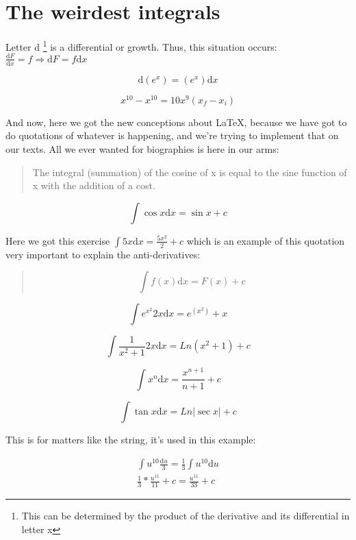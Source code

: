 \documentclass{article}
\begin{document}
\section*{The weirdest integrals}

\noindent Letter d \footnote{This can be determined by the product of the derivative and its differential in letter x} is a differential or growth. Thus, this situation occurs: $ \frac{\mathrm{d}F}{\mathrm{d}x} = f \Rightarrow \mathrm{d}F = f\mathrm{d}x $

\[ \mathrm{d}(e^x) = (e^x)\mathrm{d}x \]

\[ x^{10} - x^{10} = 10x^9(x_f - x_i) \]

\noindent And now, here we got the new conceptions about \LaTeX, because we have got to do quotations of whatever is happening, and we're trying to implement that on our texts. All we ever wanted for biographies is here in our arms:

\begin{quote}
	The integral (summation) of the cosine of x is equal to the sine function of x
	with the addition of a cost.
\end{quote}

\[ \int \cos  x \mathrm{d}x = \sin  x + c \]

\noindent Here we got this exercise $ \int 5x \mathrm{d}x = \frac{5x^2}{2} + c $ which is an example of this quotation very important to explain the anti-derivatives:

\begin{quote}
	\[ \int f(x) \mathrm{d}x = F(x) + c \]
\end{quote}


\[ \int e^{x^2}2x \mathrm{d}x = e^(x^2) + x \]

\[ \int \frac{1}{x^2 + 1}2x \mathrm{d}x = Ln(x^2 + 1) + c \]

\[ \int x^n \mathrm{d}x = \frac{x^{n + 1}}{n + 1} + c \]

\[ \int \tan x \mathrm{d}x = Ln|\sec x| + c \]

\noindent This is for matters like the string, it's used in this example:

\begin{gather*}
	\int u^{10} \frac{\mathrm{d}u}{3} = \frac{1}{3} \int u^{10} \mathrm{d}u \\
	\frac{1}{3}*\frac{u^{11}}{11}+c = \frac{u^{11}}{33}+c
\end{gather*}
\end{document}
